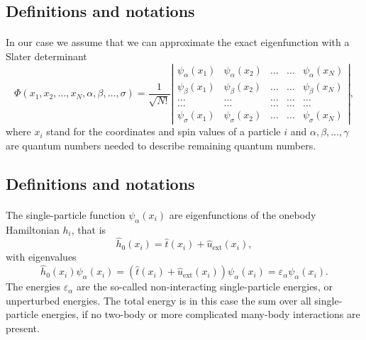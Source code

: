 \documentclass[%
twoside,                 %
final,                   %
10pt]{article}
\begin{document}
\subsection{Definitions and notations}

\paragraph{}
In our case we assume that  we can approximate the exact eigenfunction with a Slater determinant
\begin{equation}
   \Phi(x_1, x_2,\dots ,x_N,\alpha,\beta,\dots, \sigma)=\frac{1}{\sqrt{N!}}
\left| \begin{array}{ccccc} \psi_{\alpha}(x_1)& \psi_{\alpha}(x_2)& \dots & \dots & \psi_{\alpha}(x_N)\\
                            \psi_{\beta}(x_1)&\psi_{\beta}(x_2)& \dots & \dots & \psi_{\beta}(x_N)\\  
                            \dots & \dots & \dots & \dots & \dots \\
                            \dots & \dots & \dots & \dots & \dots \\
                     \psi_{\sigma}(x_1)&\psi_{\sigma}(x_2)& \dots & \dots & \psi_{\sigma}(x_N)\end{array} \right|, \label{eq:HartreeFockDet}
\end{equation}
where  $x_i$  stand for the coordinates and spin values of a particle $i$ and $\alpha,\beta,\dots, \gamma$ 
are quantum numbers needed to describe remaining quantum numbers.



\subsection{Definitions and notations}

\paragraph{}
The single-particle function $\psi_{\alpha}(x_i)$  are eigenfunctions of the onebody
Hamiltonian $h_i$, that is
\[
\hat{h}_0(x_i)=\hat{t}(x_i) + \hat{u}_{\mathrm{ext}}(x_i),
\]
with eigenvalues 
\[
\hat{h}_0(x_i) \psi_{\alpha}(x_i)=\left(\hat{t}(x_i) + \hat{u}_{\mathrm{ext}}(x_i)\right)\psi_{\alpha}(x_i)=\varepsilon_{\alpha}\psi_{\alpha}(x_i).
\]
The energies $\varepsilon_{\alpha}$ are the so-called non-interacting single-particle energies, or unperturbed energies. 
The total energy is in this case the sum over all  single-particle energies, if no two-body or more complicated
many-body interactions are present.
\end{document}
